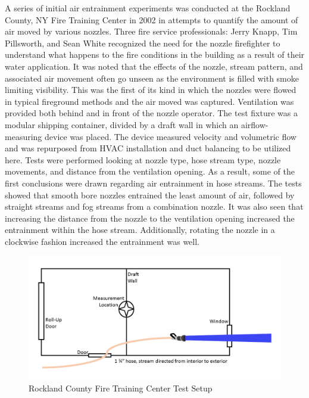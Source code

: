 \documentclass[12pt,oneside]{book}
\begin{document}
A series of initial air entrainment experiments was conducted at the Rockland County, NY Fire Training Center in 2002 in attempts to quantify the amount of air moved by various nozzles. Three fire service professionals: Jerry Knapp, Tim Pillsworth, and Sean White recognized the need for the nozzle firefighter to understand what happens to the fire conditions in the building as a result of their water application. It was noted that the effects of the nozzle, stream pattern, and associated air movement often go unseen as the environment is filled with smoke limiting visibility. This was the first of its kind in which the nozzles were flowed in typical fireground methods and the air moved was captured. Ventilation was provided both behind and in front of the nozzle operator. The test fixture was a modular shipping container, divided by a draft wall in which an airflow-measuring device was placed. The device measured velocity and volumetric flow and was repurposed from HVAC installation and duct balancing to be utilized here. Tests were performed looking at nozzle type, hose stream type, nozzle movements, and distance from the ventilation opening. As a result, some of the first conclusions were drawn regarding air entrainment in hose streams. The tests showed that smooth bore nozzles entrained the least amount of air, followed by straight streams and fog streams from a combination nozzle. It was also seen that increasing the distance from the nozzle to the ventilation opening increased the entrainment within the hose stream. Additionally, rotating the nozzle in a clockwise fashion increased the entrainment was well.

\begin{figure}[!ht]
	\centering
	\includegraphics[width=\columnwidth]{Figures/Air_Entrainment/Knapp_Layout.png}
	\caption{Rockland County Fire Training Center Test Setup}
	\label{fig:Rockland_County_Test_Setup}
\end{figure}
\end{document}
